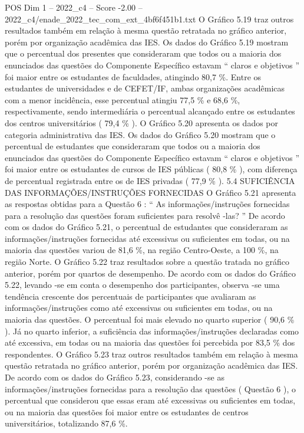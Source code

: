 \begin{textsample}{POS Dim 1 – 2022\_c4 – Score -2.00 – 2022\_c4/enade\_2022\_tec\_com\_ext\_4bf6f451b1.txt}
O Gráfico 5.19 traz outros resultados também em relação à mesma questão retratada no gráfico anterior, porém por organização acadêmica das IES.
Os dados do Gráfico 5.19 mostram que o percentual dos presentes que consideraram que todos ou a maioria dos enunciados das questões do Componente Específico estavam “ claros e objetivos ” foi maior entre os estudantes de faculdades, atingindo 80,7 \%.
Entre os estudantes de universidades e de CEFET/IF, ambas organizações acadêmicas com a menor incidência, esse percentual atingiu 77,5 \% e 68,6 \%, respectivamente, sendo intermediária o percentual alcançado entre os estudantes dos centros universitários ( 79,4 \% ).
O Gráfico 5.20 apresenta os dados por categoria administrativa das IES.
Os dados do Gráfico 5.20 mostram que o percentual de estudantes que consideraram que todos ou a maioria dos enunciados das questões do Componente Específico estavam “ claros e objetivos ” foi maior entre os estudantes de cursos de IES públicas ( 80,8 \% ), com diferença de percentual registrada entre os de IES privadas ( 77,9 \% ). 5.4 SUFICIÊNCIA DAS INFORMAÇÕES/INSTRUÇÕES FORNECIDAS O Gráfico 5.21 apresenta as respostas obtidas para a Questão 6 : “ As informações/instruções fornecidas para a resolução das questões foram suficientes para resolvê -las? ” De acordo com os dados do Gráfico 5.21, o percentual de estudantes que consideraram as informações/instruções fornecidas até excessivas ou suficientes em todas, ou na maioria das questões variou de 81,6 \%, na região Centro-Oeste, a 100 \%, na região Norte.
O Gráfico 5.22 traz resultados sobre a questão tratada no gráfico anterior, porém por quartos de desempenho.
De acordo com os dados do Gráfico 5.22, levando -se em conta o desempenho dos participantes, observa -se uma tendência crescente dos percentuais de participantes que avaliaram as informações/instruções como até excessivas ou suficientes em todas, ou na maioria das questões.
O percentual foi mais elevado no quarto superior ( 90,6 \% ).
Já no quarto inferior, a suficiência das informações/instruções declaradas como até excessiva, em todas ou na maioria das questões foi percebida por 83,5 \% dos respondentes.
O Gráfico 5.23 traz outros resultados também em relação à mesma questão retratada no gráfico anterior, porém por organização acadêmica das IES.
De acordo com os dados do Gráfico 5.23, considerando -se as informações/instruções fornecidas para a resolução das questões ( Questão 6 ), o percentual que considerou que essas eram até excessivas ou suficientes em todas, ou na maioria das questões foi maior entre os estudantes de centros universitários, totalizando 87,6 \%.

\end{textsample}
